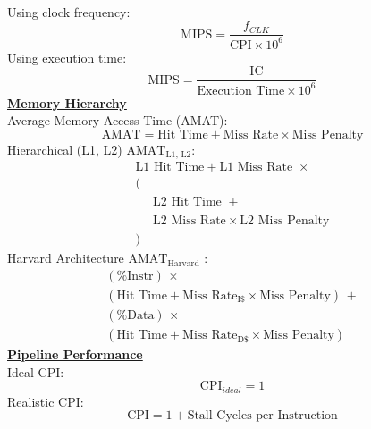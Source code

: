 \documentclass[a4paper,12pt]{article}
\begin{document}
\begin{multicols}{2}
    \\
    Using clock frequency:
    \begin{equation*}
        \text{MIPS} = \dfrac{f_{CLK}}{\text{CPI} \times 10^6}
    \end{equation*}
    Using execution time:
    \begin{equation*}
        \text{MIPS} = \dfrac{\text{IC}}{\text{Execution Time} \times 10^6}
    \end{equation*}
    \textbf{\underline{Memory Hierarchy}}
    \\
    Average Memory Access Time (AMAT):
    \begin{equation*}
        \text{AMAT} = \text{Hit Time} + \text{Miss Rate} \times \text{Miss Penalty}
    \end{equation*}
    Hierarchical (L1, L2) $\text{AMAT}_{\text{L1, L2}}$:
    \begin{equation*}
        \begin{array}{l}
            \text{L1 Hit Time} + \text{L1 Miss Rate } \times \\
            ( \\
             \phantom{(}\quad\text{L2 Hit Time } + \\
             \phantom{(}\quad \text{L2 Miss Rate} \times \text{L2 Miss Penalty} \\
            )
        \end{array}
    \end{equation*}
    Harvard Architecture $\text{AMAT}_{\text{Harvard}}$ :
    \begin{equation*}
        \begin{array}{l}
             (\%\text{Instr})\, \times \\ [.5em]
             (\text{Hit Time} + \text{Miss Rate}_{\text{I}\$} \times \text{Miss Penalty})\, + \\ [.5em]
             (\%\text{Data})\, \times \\ [.5em]
             (\text{Hit Time} + \text{Miss Rate}_{\text{D}\$} \times \text{Miss Penalty})
        \end{array}
    \end{equation*}
    \textbf{\underline{Pipeline Performance}}
    \\
    Ideal CPI:
    \begin{equation*}
        \text{CPI}_{ideal} = 1
    \end{equation*}
    Realistic CPI:
    \begin{equation*}
        \text{CPI} = 1 + \text{Stall Cycles per Instruction}

\end{equation*}
\end{multicols}
\end{document}
